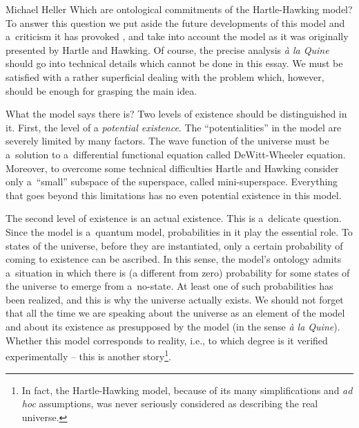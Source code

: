 \begin{artengenv}{Michael Heller}
Which are ontological commitments of the Hartle-Hawking model? To answer this question we put aside the future
developments of this model and a~criticism it has provoked \parencite[see for instance][]{mccabe_structure_2005},
and take into account the model as it was originally presented by Hartle and Hawking. Of course, the precise analysis
\textit{à la Quine} should go into technical details which cannot be done in this essay. We must be satisfied with a
rather superficial dealing with the problem which, however, should be enough for grasping the main idea.

What the model says there is? Two levels of existence should be distinguished in it. First, the level of a
\textit{potential existence}. The ``potentialities'' in the model are severely limited by many factors. The wave function
of the universe must be a~solution to a~differential functional equation called DeWitt-Wheeler equation. Moreover,  to
overcome some technical difficulties Hartle and Hawking consider only a~``small'' subspace of the superspace, called
mini-superspace. Everything that goes beyond this limitations has no even potential existence in this model.

The second level of existence is an actual existence. This is a~delicate question. Since the model is a~quantum
model, probabilities in it play the essential role. To states of the universe, before they are instantiated, only a
certain probability of coming to existence can be ascribed. In this sense, the model’s ontology admits a~situation in
which there is (a different from zero) probability for some states of the universe to emerge from a~no-state. At least
one of such probabilities has been realized, and this is why the universe actually exists. We should not forget that
all the time we are speaking about the universe as an element of the model and about its existence as presupposed by
the model (in the sense \textit{à la Quine}). Whether this model corresponds to reality, i.e., to which degree is it
verified experimentally – this is another story\footnote{In fact, the Hartle-Hawking model, because of its many
simplifications and \textit{ad hoc} assumptions, was never seriously considered as describing the real universe.}.


\end{artengenv}

